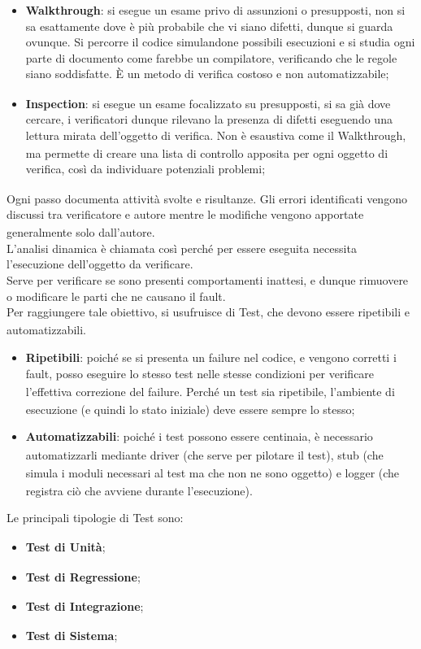 \documentclass[a4paper,11pt]{article}
\newcommand{\G}{\textsubscript{\scalebox{0.6}{\textbf{G}}}}
\begin{document}
\begin{itemize}
    \item \textbf{Walkthrough}: si esegue un esame privo di assunzioni o presupposti, non si sa esattamente dove è più probabile che vi siano difetti, dunque si guarda ovunque. Si percorre il codice simulandone possibili esecuzioni e si studia ogni parte di documento come farebbe un compilatore, verificando che le regole siano soddisfatte. È un metodo di verifica\G{} costoso e non automatizzabile;
    \item \textbf{Inspection}: si esegue un esame focalizzato su presupposti, si sa già dove cercare, i verificatori dunque rilevano la presenza di difetti eseguendo una lettura mirata dell'oggetto di verifica\G{}. Non è esaustiva come il Walkthrough, ma permette di creare una lista di controllo apposita per ogni oggetto di verifica\G{}, così da individuare potenziali problemi;
\end{itemize}
Ogni passo documenta attività svolte e risultanze. Gli errori identificati vengono discussi tra verificatore\G{} e autore mentre le modifiche vengono apportate generalmente solo dall'autore.\\
L'analisi dinamica è chiamata così perché per essere eseguita necessita l'esecuzione dell'oggetto da verificare.\\
Serve per verificare se sono presenti comportamenti inattesi, e dunque rimuovere o modificare le parti che ne causano il fault.\\
Per raggiungere tale obiettivo, si usufruisce di Test\G{}, che devono essere ripetibili e automatizzabili.
\begin{itemize}
    \item \textbf{Ripetibili}: poiché se si presenta un failure nel codice, e vengono corretti i fault, posso eseguire lo stesso test\G{} nelle stesse condizioni per verificare l'effettiva correzione del failure. Perché un test\G{} sia ripetibile, l'ambiente di esecuzione (e quindi lo stato iniziale) deve essere sempre lo stesso;
    \item \textbf{Automatizzabili}: poiché i test\G{} possono essere centinaia, è necessario automatizzarli mediante  driver (che serve per pilotare il test\G{}), stub (che simula i moduli necessari al test\G{} ma che non ne sono oggetto) e logger (che registra ciò che avviene durante l'esecuzione).
\end{itemize}
Le principali tipologie di Test\G{} sono:
\begin{itemize}
    \item \textbf{Test\G{} di Unità}\G{};
    \item \textbf{Test\G{} di Regressione};
    \item \textbf{Test\G{} di Integrazione}\G{};
    \item \textbf{Test\G{} di Sistema}\G{};
\end{itemize}
\end{document}
